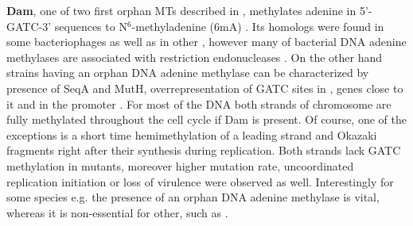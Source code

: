 \textbf{Dam}, one of two first orphan MTs described in , methylates adenine in 5'-GATC-3' sequences to N$^6$-methyladenine (6mA) \cite{marinus1973isolation}.
Its homologs were found in some bacteriophages as well as in other , however many of bacterial DNA adenine methylases are associated with restriction endonucleases \cite{low2001roles, casadesus2006epigenetic, bochow2012bacteriophage}.
On the other hand strains having an orphan DNA adenine methylase can be characterized by presence of SeqA and MutH, overrepresentation of GATC sites in , genes close to it and in the  promoter \cite{sobetzko2016distamo}.
For most of the DNA both strands of chromosome are fully methylated throughout the cell cycle if Dam is present.
Of course, one of the exceptions is a short time hemimethylation of a leading strand and Okazaki fragments right after their synthesis during replication.
Both strands lack GATC methylation in  mutants, moreover higher mutation rate, uncoordinated replication initiation or loss of virulence were observed as well.
Interestingly for some species e.g.  the presence of an orphan DNA adenine methylase is vital, whereas it is non-essential for other, such as  \cite{casadesus2006epigenetic, casadesus2013programmed, adhikari2016dna}.

